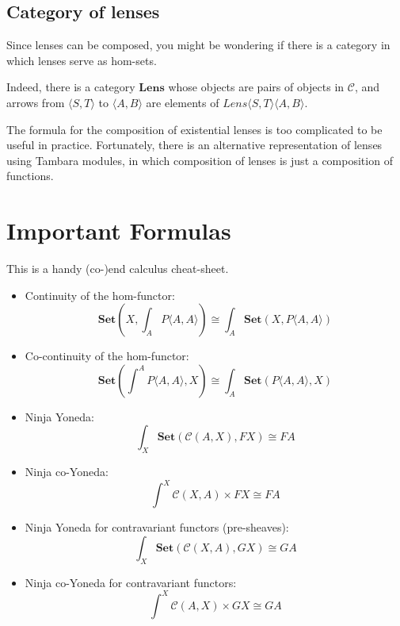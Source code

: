\documentclass[DaoFP]{subfiles}
\begin{document}
\subsection{Category of lenses}

Since lenses can be composed, you might be wondering if there is a category in which lenses serve as hom-sets. 

Indeed, there is a category $\mathbf{Lens}$ whose objects are pairs of objects in $\mathcal{C}$, and arrows from $\langle S, T\rangle$ to $ \langle A, B \rangle$ are elements of  $\mathit{Lens} \langle S, T\rangle \langle A, B \rangle$.

The formula for the composition of existential lenses is too complicated to be useful in practice. Fortunately, there is an alternative representation of lenses using Tambara modules, in which composition of lenses is just a composition of functions.

\section{Important Formulas}
This is a handy (co-)end calculus cheat-sheet.
\begin{itemize}
\item Continuity of the hom-functor:
\[ \mathbf{Set}\left(X, \int_A P\langle A, A \rangle \right) \cong \int_A  \mathbf{Set}(X, P\langle A, A \rangle) \]
\item Co-continuity of the hom-functor:
\[ \mathbf{Set}\left( \int^A P\langle A, A \rangle , X\right) \cong \int_A  \mathbf{Set}(P\langle A, A \rangle, X) \]
\item Ninja Yoneda:
\[ \int_{X} \mathbf{Set} (\mathcal{C}(A, X), FX) \cong FA \]
\item Ninja co-Yoneda:
\[ \int^{X} \mathcal{C}(X, A) \times F X \cong F A \]
\item Ninja Yoneda for contravariant functors (pre-sheaves):
\[ \int_{X} \mathbf{Set} (\mathcal{C}(X, A), GX) \cong GA \]
\item Ninja co-Yoneda for contravariant functors:
\[ \int^{X} \mathcal{C}(A, X) \times G X \cong G A \]
\end{itemize}
\end{document}

